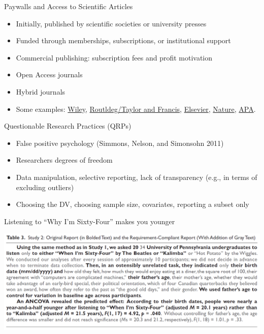 \documentclass[
  ignorenonframetext,
  aspectratio=169,
]{beamer}
\providecommand{\tightlist}{%
  \setlength{\itemsep}{0pt}\setlength{\parskip}{0pt}}\usepackage{longtable,booktabs,array}
\begin{document}
\begin{frame}{Paywalls and Access to Scientific Articles}
\label{paywalls-and-access-to-scientific-articles}
\begin{itemize}[<+->]
\tightlist
\item
  Initially, published by scientific societies or university presses
\item
  Funded through memberships, subscriptions, or institutional support
\item
  Commercial publishing: subscription fees and profit motivation
\item
  Open Access journals
\item
  Hybrid journals
\item
  Some examples: \href{https://onlinelibrary.wiley.com}{Wiley},
  \href{https://www.taylorfrancis.com}{Routldeg/Taylor and Francis},
  \href{https://www.elsevier.com/products/sciencedirect/journals}{Elsevier},
  \href{https://www.nature.com/nature/journal-impact}{Nature},
  \href{https://www.apa.org/pubs/journals}{APA}.
\end{itemize}
\end{frame}

\begin{frame}{Questionable Research Practices (QRPs)}
\label{questionable-research-practices-qrps}
\begin{itemize}[<+->]
\tightlist
\item
  False positive psychology (Simmons, Nelson, and Simonsohn 2011)
\item
  Researchers degrees of freedom
\item
  Data manipulation, selective reporting, lack of transparency (e.g., in
  terms of excluding outliers)
\item
  Choosing the DV, choosing sample size, covariates, reporting a subset
  only
\end{itemize}
\end{frame}

\begin{frame}{Listening to ``Why I'm Sixty-Four'' makes you younger}
\label{listening-to-why-im-sixty-four-makes-you-younger}
\end{frame}

\begin{frame}{\begin{center}
\includegraphics{figs/p-Hacking.png}
\end{center}
}
\label{section}
\end{frame}
\end{document}
